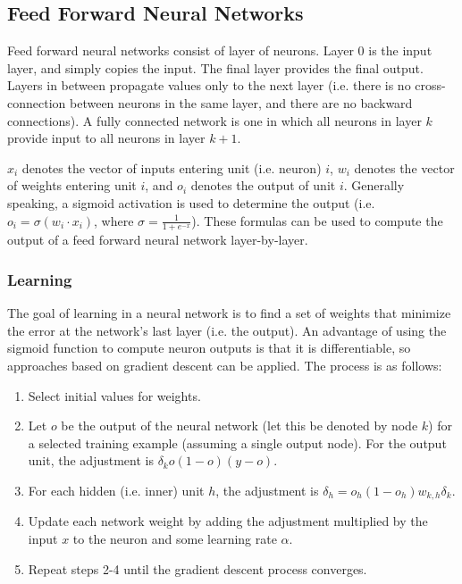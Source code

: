 \documentclass[12pt,titlepage]{article}
\begin{document}
    \subsection{Feed Forward Neural Networks}
      Feed forward neural networks consist of layer of neurons. Layer 0 is the input layer, and simply copies the input. The final layer provides the final output.
      Layers in between propagate values only to the next layer (i.e. there is no cross-connection between neurons in the same layer, and there are no backward connections).
      A fully connected network is one in which all neurons in layer $k$ provide input to all neurons in layer $k+1$.

      $x_i$ denotes the vector of inputs entering unit (i.e. neuron) $i$, $w_i$ denotes the vector of weights entering unit $i$, and $o_i$ denotes the output of unit $i$.
      Generally speaking, a sigmoid activation is used to determine the output (i.e. $o_i = \sigma(w_i \cdot x_i)$, where $\sigma = \frac{1}{1 + e^{-x}}$). These formulas
      can be used to compute the output of a feed forward neural network layer-by-layer.

      \subsubsection{Learning}
        The goal of learning in a neural network is to find a set of weights that minimize the error at the network's last layer (i.e. the output). An advantage of using
        the sigmoid function to compute neuron outputs is that it is differentiable, so approaches based on gradient descent can be applied. The process is as follows:

        \begin{enumerate}
          \item Select initial values for weights.
          \item Let $o$ be the output of the neural network (let this be denoted by node $k$) for a selected training example (assuming a single output node). For the output
            unit, the adjustment is $\delta_{k} o(1-o)(y-o)$.
          \item For each hidden (i.e. inner) unit $h$, the adjustment is $\delta_{h} = o_h(1 - o_h)w_{k,h}\delta_{k}$.
          \item Update each network weight by adding the adjustment multiplied by the input $x$ to the neuron and some learning rate $\alpha$.
          \item Repeat steps 2-4 until the gradient descent process converges.
        \end{enumerate}
\end{document}

